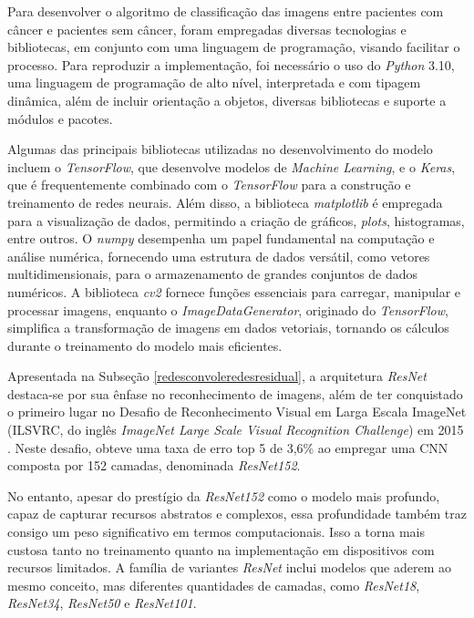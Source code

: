 Para desenvolver o algoritmo de classificação das imagens entre pacientes com câncer e pacientes sem câncer, foram empregadas diversas tecnologias e bibliotecas, em conjunto com uma linguagem de programação, visando facilitar o processo. Para reproduzir a implementação, foi necessário o uso do \textit{Python} 3.10, uma linguagem de programação de alto nível, interpretada e com tipagem dinâmica, além de incluir orientação a objetos, diversas bibliotecas e suporte a módulos e pacotes.

Algumas das principais bibliotecas utilizadas no desenvolvimento do modelo incluem o \textit{TensorFlow}, que desenvolve modelos de \textit{Machine Learning}, e o \textit{Keras}, que é frequentemente combinado com o \textit{TensorFlow} para a construção e treinamento de redes neurais. Além disso, a biblioteca \textit{matplotlib} é empregada para a visualização de dados, permitindo a criação de gráficos, \textit{plots}, histogramas, entre outros. O \textit{numpy} desempenha um papel fundamental na computação e análise numérica, fornecendo uma estrutura de dados versátil, como vetores multidimensionais, para o armazenamento de grandes conjuntos de dados numéricos. A biblioteca \textit{cv2} fornece funções essenciais para carregar, manipular e processar imagens, enquanto o \textit{ImageDataGenerator}, originado do \textit{TensorFlow}, simplifica a transformação de imagens em dados vetoriais, tornando os cálculos durante o treinamento do modelo mais eficientes.


Apresentada na Subseção \ref{redesconvoleredesresidual}, a arquitetura \textit{ResNet} destaca-se por sua ênfase no reconhecimento de imagens, além de ter conquistado o primeiro lugar no Desafio de Reconhecimento Visual em Larga Escala ImageNet (ILSVRC, do inglês \textit{ImageNet Large Scale Visual Recognition Challenge}) em 2015 \cite{resnet50analisys}. Neste desafio, obteve uma taxa de erro top 5 de 3,6\% ao empregar uma CNN composta por 152 camadas, denominada \textit{ResNet152}.

No entanto, apesar do prestígio da \textit{ResNet152} como o modelo mais profundo, capaz de capturar recursos abstratos e complexos, essa profundidade também traz consigo um peso significativo em termos computacionais. Isso a torna mais custosa tanto no treinamento quanto na implementação em dispositivos com recursos limitados. A família de variantes \textit{ResNet} inclui modelos que aderem ao mesmo conceito, mas diferentes quantidades de camadas, como \textit{ResNet18}, \textit{ResNet34}, \textit{ResNet50} e \textit{ResNet101}. 

